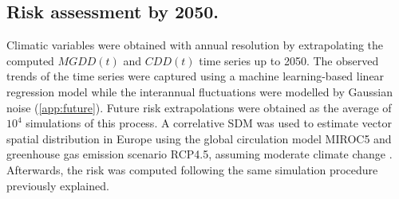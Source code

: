     \subsection{Risk assessment by 2050.} Climatic variables were obtained with
    annual resolution by extrapolating the computed $MGDD(t)$ and $CDD(t)$ time
    series up to 2050. The observed trends of the time series were captured
    using a
    machine learning-based linear regression model while the interannual
    fluctuations were modelled by Gaussian noise (\cref{app:future}).
    Future
    risk extrapolations were obtained as the average of $10^4$ simulations of
this
process. A correlative SDM was used to estimate vector spatial distribution in
Europe using the global circulation model MIROC5 and greenhouse gas emission
scenario RCP4.5, assuming moderate climate change \cite{Godefroid2021}.
Afterwards, the risk was computed following the same simulation procedure
previously explained.

